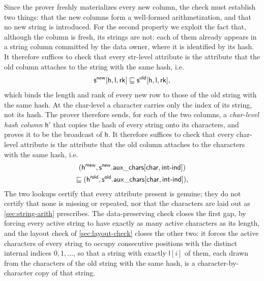  Since the prover freshly materializes every new column, the check must establish two things: that the new columns form a well-formed arithmetization, and that no new string is introduced. For the second property we exploit the fact that, although the column is fresh, its strings are not: each of them already appears in a string column committed by the data owner, where it is identified by its hash. It therefore suffices to check that every str-level attribute is the attribute that the old column attaches to the string with the same hash, i.e.
\begin{equation}
  \label{eq:main-lkup}
  \mathsf{s}^{\mathsf{new}}[\mathsf{h}, \mathsf{l}, \mathsf{rk}] \sqsubseteq \mathsf{s}^{\mathsf{old}}[\mathsf{h}, \mathsf{l}, \mathsf{rk}],
\end{equation}
which binds the length and rank of every new row to those of the old string with the same hash. At the char-level a character carries only the index of its string, not its hash. The prover therefore sends, for each of the two columns, a \emph{char-level hash column} $\mathsf{h}'$ that copies the hash of every string onto its characters, and proves it to be the broadcast of $\mathsf{h}$. It therefore suffices to check that every char-level attribute is the attribute that the old column attaches to the characters with the same hash, i.e.
\begin{multline}
  \label{eq:aux-lkup}
  (\mathsf{h}'^{\mathsf{new}}, \mathsf{s}^{\mathsf{new}}.\mathsf{aux\_chars}[\mathsf{char}, \mathsf{int\text{-}ind}]) \\
  \sqsubseteq (\mathsf{h}'^{\mathsf{old}}, \mathsf{s}^{\mathsf{old}}.\mathsf{aux\_chars}[\mathsf{char}, \mathsf{int\text{-}ind}]),
\end{multline}
The two lookups certify that every attribute present is genuine; they do not certify that none is missing or repeated, nor that the characters are laid out as \cref{sec:string-arith} prescribes. The data-preserving check closes the first gap, by forcing every active string to have exactly as many active characters as its length, and the layout check of \cref{sec:layout-check} closes the other two: it forces the active characters of every string to occupy consecutive positions with the distinct internal indices $0, 1, \dots$, so that a string with exactly $\mathsf{l}[i]$ of them, each drawn from the characters of the old string with the same hash, is a character-by-character copy of that string.

